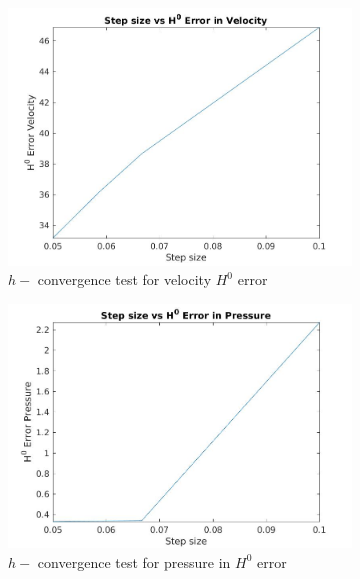 \documentclass[a4paper]{book}
\begin{document}
\begin{figure}
\begin{subfigure}{\textwidth}	
  \includegraphics[width=\linewidth]{H0_convergence_velocity_n_s.jpg}
  \caption{$h-$ convergence test for velocity $H^0$ error}
  \label{fig:vel_navier_stoke_conv_h0}
\end{subfigure}
\begin{subfigure}{\textwidth}	
  \includegraphics[width=\linewidth]{H0_convergence_pressure_n_s.jpg}
  \caption{$h-$ convergence test for pressure in $H^0$ error}
  \label{fig:pre_navier_stoke_conv_h0}
\end{subfigure}
\caption{\label{navier_stoke_conv_h0}}
\end{figure}
\end{document}
